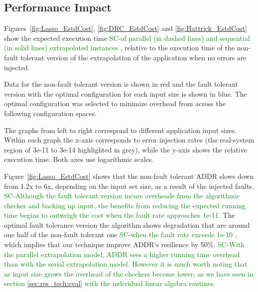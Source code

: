 \documentclass[10pt, conference, compsocconf]{IEEEtran}
\newcommand{\sui}[1]{%
  \textcolor{green}{SC-#1}
}
\begin{document}
\subsection{Performance Impact}
\label{sec:eval:perf}
Figures~\ref{fig:Lasso_EstdCost}, \ref{fig:DRC_EstdCost} and \ref{fig:Hattrick_EstdCost} show the expected execution time \sui{of parallel (in dashed lines) and sequential (in solid lines) extrapolated instances}, relative to the execution time of the non-fault tolerant version of the extrapolation of the application when no errors are injected.

Data for the non-fault tolerant version is shown in red and the fault tolerant version with the optimal configuration for each input size is shown in blue.
The optimal configuration was selected to minimize overhead from across the following configuration spaces.

The graphs from left to right correspond to different application input sizes. Within each graph the x-axis corresponds to error injection rates (the real-system region of 3e-11 to 3e-14 highlighted in grey), while the y-axis shows the relative execution time. Both axes use logarithmic scales.


Figure~\ref{fig:Lasso_EstdCost} shows that the non-fault tolerant ADDR slows down from 1.2x to 6x, depending on the input set size, as a result of the injected faults.
\sui{Although the fault tolerant version incurs overheads from the algorithmic checker and backing up input, the benefits from reducing the expected running time begins to outweigh the cost when the fault rate approaches 1e-11.} The optimal fault tolerance version the algorithm shows degradation that are around one half of the non-fault tolerant one \sui{when the fault rate exceeds 1e-10}, which implies that our technique improve ADDR's resilience by 50\%.
\sui{With the parallel extrapolation model, ADDR sees a higher running time overhead than with the serial extrapolation model. However it is much worth noting that as input size grows the overhead of the checkers become lower, as we have seen in section \ref{sec:res_tech:eval} with the individual linear algebra routines.}
\end{document}
